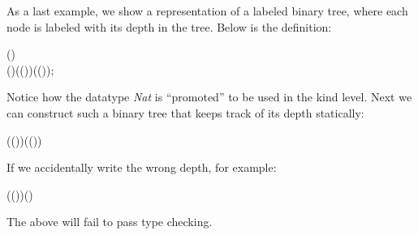 As a last example, we show a representation of a labeled binary tree,
where each node is labeled with its depth in the tree. Below is the
definition:
\begin{hscode}\SaveRestoreHook
{}%
%
%
%
\>[3]{}\;\;(\mathbin{:})\mathrel{=}\<[E]%
\\
\>[3]{}\<[5]%
\>[5]{}\mid {}\;(\mathbin{:})\;(\mathbin{:}\;(\;))\;(\mathbin{:}\;(\;));{}\<[E]%
\ColumnHook
\end{hscode}\resethooks
Notice how the datatype \emph{Nat} is ``promoted'' to be used in the
kind level. Next we can construct such a binary tree that keeps track
of its depth statically:\begin{hscode}\SaveRestoreHook
{}%
%
%
\>[3]{}\;\;\;(\;(\;))\;(\;(\;)){}\<[E]%
\ColumnHook
\end{hscode}\resethooks
If we accidentally write the wrong depth, for example:\begin{hscode}\SaveRestoreHook
{}%
%
%
\>[3]{}\;\;\;(\;(\;))\;(\;){}\<[E]%
\ColumnHook
\end{hscode}\resethooks
The above will fail to pass type checking.

 
